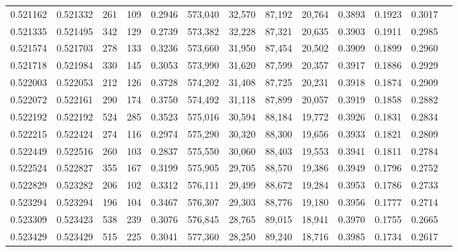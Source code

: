 \begin{tabular}{rrrrrrrrrrrrr}
0.521162 & 0.521332 &   261 &   109 &                                     0.2946 & 573,040 &  32,570 &  87,192 &  20,764 & 0.3893 & 0.1923 & 0.3017 \\
0.521335 & 0.521495 &   342 &   129 &                                     0.2739 & 573,382 &  32,228 &  87,321 &  20,635 & 0.3903 & 0.1911 & 0.2985 \\
0.521574 & 0.521703 &   278 &   133 &                                     0.3236 & 573,660 &  31,950 &  87,454 &  20,502 & 0.3909 & 0.1899 & 0.2960 \\
0.521718 & 0.521984 &   330 &   145 &                                     0.3053 & 573,990 &  31,620 &  87,599 &  20,357 & 0.3917 & 0.1886 & 0.2929 \\
0.522003 & 0.522053 &   212 &   126 &                                     0.3728 & 574,202 &  31,408 &  87,725 &  20,231 & 0.3918 & 0.1874 & 0.2909 \\
0.522072 & 0.522161 &   290 &   174 &                                     0.3750 & 574,492 &  31,118 &  87,899 &  20,057 & 0.3919 & 0.1858 & 0.2882 \\
0.522192 & 0.522192 &   524 &   285 &                                     0.3523 & 575,016 &  30,594 &  88,184 &  19,772 & 0.3926 & 0.1831 & 0.2834 \\
0.522215 & 0.522424 &   274 &   116 &                                     0.2974 & 575,290 &  30,320 &  88,300 &  19,656 & 0.3933 & 0.1821 & 0.2809 \\
0.522449 & 0.522516 &   260 &   103 &                                     0.2837 & 575,550 &  30,060 &  88,403 &  19,553 & 0.3941 & 0.1811 & 0.2784 \\
0.522524 & 0.522827 &   355 &   167 &                                     0.3199 & 575,905 &  29,705 &  88,570 &  19,386 & 0.3949 & 0.1796 & 0.2752 \\
0.522829 & 0.523282 &   206 &   102 &                                     0.3312 & 576,111 &  29,499 &  88,672 &  19,284 & 0.3953 & 0.1786 & 0.2733 \\
0.523294 & 0.523294 &   196 &   104 &                                     0.3467 & 576,307 &  29,303 &  88,776 &  19,180 & 0.3956 & 0.1777 & 0.2714 \\
0.523309 & 0.523423 &   538 &   239 &                                     0.3076 & 576,845 &  28,765 &  89,015 &  18,941 & 0.3970 & 0.1755 & 0.2665 \\
0.523429 & 0.523429 &   515 &   225 &                                     0.3041 & 577,360 &  28,250 &  89,240 &  18,716 & 0.3985 & 0.1734 & 0.2617 \\

\end{tabular}
